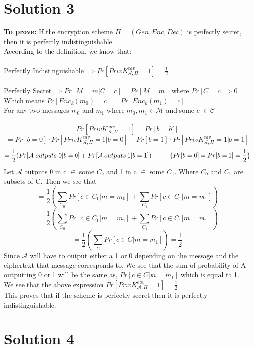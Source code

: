 \documentclass{article}
\newcommand\tab[1][1cm]{\hspace*{#1}}
\begin{document}
    \section*{Solution 3}
        \textbf{To prove:} If the encryption scheme $\Pi = (Gen, Enc, Dec)$ is perfectly secret, then it is perfectly indistinguishable.\\
        \tab According to the definition, we know that:\\\\
        Perfectly Indistinguishable $\Rightarrow Pr[PrivK_{\mathcal{A},\Pi}^{eav} = 1] = \frac{1}{2}$\\\\
        Perfectly Secret $\Rightarrow Pr[M = m | C = c] = Pr[M = m]$ where $Pr[C = c] > 0$\\
        Which means $Pr[Enc_k(m_0) = c] = Pr[Enc_k(m_1) = c]$\\
        For any two messages $m_0$ and $m_1$ where $m_0, m_1 \in \mathcal{M}$ and some c $\in \mathcal{C}$\\\\
        \[Pr[PrivK_{\mathcal{A},\Pi}^{eav} = 1] = Pr[b = b']\]
        \[= Pr[b = 0]\cdot Pr[PrivK_{\mathcal{A},\Pi}^{eav} = 1|b = 0] + Pr[b = 1]\cdot Pr[PrivK_{\mathcal{A},\Pi}^{eav} = 1|b = 1]\]
        \[= \frac{1}{2}(Pr[\mathcal{A}\; outputs\; 0|b=0]+Pr[\mathcal{A}\; outputs\; 1|b=1])\tab \{Pr[b = 0] = Pr[b = 1] = \frac{1}{2}\}\]
        Let $\mathcal{A}$ outputs 0 in c $\in$ some $C_0$ and 1 in c $\in$ some $C_1$. Where $C_0$ and $C_1$ are subsets of C. Then we see that
        \[= \frac{1}{2}(\sum_{C_0}Pr[c \in C_0 | m = m_0] + \sum_{C_1}Pr[c \in C_1 | m = m_1])\]
        \[= \frac{1}{2}(\sum_{C_0}Pr[c \in C_0 | m = m_1] + \sum_{C_1}Pr[c \in C_1 | m = m_1])\]
        \[= \frac{1}{2}(\sum_{C}Pr[c \in C | m = m_1]) = \frac{1}{2}\]
        Since $\mathcal{A}$ will have to output either a 1 or 0 depending on the message and the ciphertext that message corresponds to. We see that the sum of probability of A outputting 0 or 1 will be the same as, $Pr[c \in C | m = m_1]$ which is equal to 1.\\
        We see that the above expression $Pr[PrivK_{\mathcal{A},\Pi}^{eav} = 1] = \frac{1}{2}$\\
        This proves that if the scheme is perfectly secret then it is perfectly indistinguishable.

    \section*{Solution 4}
\end{document}
